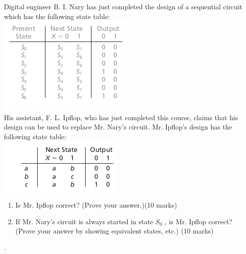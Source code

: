 \begin{prob}
  Digital engineer B. I. Nary has just completed the design of a sequential circuit
  which has the following state table:\\
  \includegraphics[width=0.5\linewidth]{fig-15.3a.png}\\
  His assistant, F. L. Ipflop, who has just completed this course, claims that
his design can be used to replace Mr. Nary’s circuit. Mr. Ipflop’s design has
the following state table:\\
\includegraphics[width=0.5\linewidth]{fig-15.3b.png}\\
\begin{enumerate}
\item Is Mr. Ipflop correct? (Prove your answer.)(10 marks)
\item If Mr. Nary’s circuit is always started in state $S_0$ , is Mr. Ipflop correct? (Prove
  your answer by showing equivalent states, etc.) (10 marks)
  \end{enumerate} .
\end{prob}

